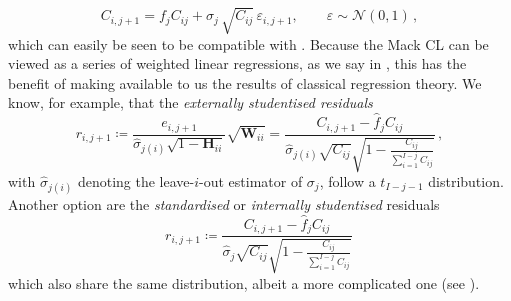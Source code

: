 \documentclass[a4paper]{book}
\begin{document}
\begin{equation} \label{eq:time-series-model}
    C_{i, j + 1} = f_j C_{ij} + \sigma_j \, \sqrt{C_{ij}} \, \varepsilon_{i, j + 1}, \qquad \varepsilon \sim \mathcal{N}(0, 1) \,,
\end{equation}
which can easily be seen to be compatible with . Because the Mack CL can be viewed as a series of weighted linear regressions, as we say in , this has the benefit of making available to us the results of classical regression theory. We know, for example, that the \emph{externally studentised residuals}
\begin{equation}
  r_{i, j + 1} 
  \coloneqq \frac{e_{i, j + 1}}{\widehat{\sigma}_{j (i)} \sqrt{1 - \mathbf{H}_{ii}}} \sqrt{\mathbf{W}_{ii}} 
  = \frac{C_{i, j + 1} - \widehat{f}_j C_{ij}}{\widehat{\sigma}_{j (i)} \sqrt{C_{ij}} \sqrt{1 - \frac{C_{ij}}{\sum_{i = 1}^{I - j} C_{ij}}}} \,,
\end{equation}
with $\widehat{\sigma}_{j (i)}$ denoting the leave-$i$-out estimator of $\sigma_j$, follow a $t_{I - j - 1}$ distribution. Another option are the \emph{standardised} or \emph{internally studentised} residuals
\begin{equation}
  r_{i, j + 1} \coloneqq \frac{C_{i, j + 1} - \widehat{f}_j C_{ij}}{\widehat{\sigma}_j \sqrt{C_{ij}} \sqrt{1 - \frac{C_{ij}}{\sum_{i = 1}^{I - j} C_{ij}}}} \,
\end{equation}
which also share the same distribution, albeit a more complicated one (see \cite[267 \psqq]{seber}). 
\end{document}
